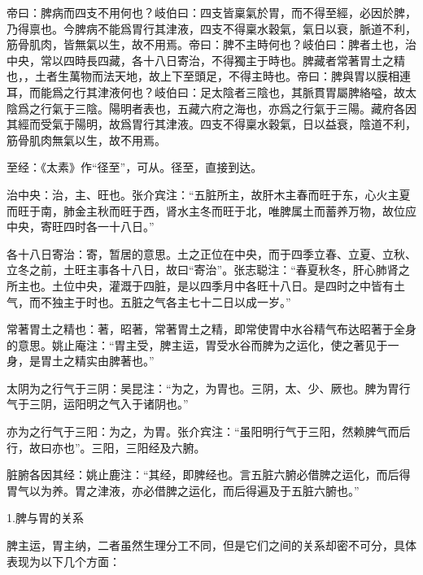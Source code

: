 \documentclass[12pt]{ctexbook}
\begin{document}

\begin{yuanwen}
帝曰：脾病而四支不用何也？岐伯曰：四支皆稟氣於胃，而不得至經，必因於脾，乃得禀也。今脾病不能爲胃行其津液，四支不得稟水穀氣，氣日以衰，脈道不利，筋骨肌肉，皆無氣以生，故不用焉。帝曰：脾不主時何也？岐伯曰：脾者土也，治中央，常以四時長四藏，各十八日寄治，不得獨主于時也。脾藏者常著胃土之精也，，土者生萬物而法天地，故上下至頭足，不得主時也。帝曰：脾與胃以膜相連耳，而能爲之行其津液何也？岐伯曰：足太陰者三陰也，其脈貫胃屬脾絡嗌，故太陰爲之行氣于三陰。陽明者表也，五藏六府之海也，亦爲之行氣于三陽。藏府各因其經而受氣于陽明，故爲胃行其津液。四支不得稟水穀氣，日以益衰，陰道不利，筋骨肌肉無氣以生，故不用焉。
\end{yuanwen}


\begin{jiaozhu}
	\item 至经：《太素》作“径至”，可从。径至，直接到达。
	\item 治中央：治，主、旺也。张介宾注：“五脏所主，故肝木主春而旺于东，心火主夏而旺于南，肺金主秋而旺于西，肾水主冬而旺于北，唯脾属土而蓄养万物，故位应中央，寄旺四时各一十八日。”
	\item 各十八日寄治：寄，暂居的意思。土之正位在中央，而于四季立春、立夏、立秋、立冬之前，土旺主事各十八日，故曰“寄治”。张志聪注：“春夏秋冬，肝心肺肾之所主也。土位中央，灌溉于四脏，是以四季月中各旺十八日。是四时之中皆有土气，而不独主于时也。五脏之气各主七十二日以成一岁。”
	\item 常著胃土之精也：著，昭著，常著胃土之精，即常使胃中水谷精气布达昭著于全身的意思。姚止庵注：“胃主受，脾主运，胃受水谷而脾为之运化，使之著见于一身，是胃土之精实由脾著也。”
	\item 太阴为之行气于三阴：吴昆注：“为之，为胃也。三阴，太、少、厥也。脾为胃行气于三阴，运阳明之气入于诸阴也。”
	\item 亦为之行气于三阳：为之，为胃。张介宾注：“虽阳明行气于三阳，然赖脾气而后行，故曰亦也”。三阳，三阳经及六腑。
	\item 脏腑各因其经：姚止鹿注：“其经，即脾经也。言五脏六腑必借脾之运化，而后得胃气以为养。胃之津液，亦必借脾之运化，而后得遍及于五脏六腑也。”
\end{jiaozhu}


1.脾与胃的关系

脾主运，胃主纳，二者虽然生理分工不同，但是它们之间的关系却密不可分，具体表现为以下几个方面：
\end{document}

